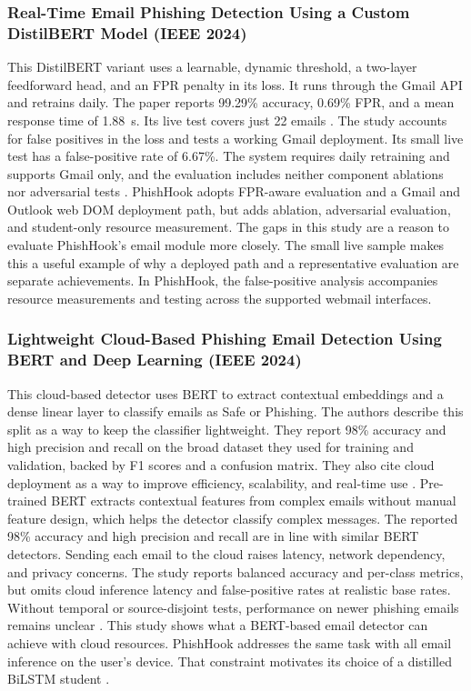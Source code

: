 \documentclass{FastFyp}
\begin{document}
\subsubsection{Real-Time Email Phishing Detection Using a Custom DistilBERT Model (IEEE 2024)}
This DistilBERT variant uses a learnable, dynamic threshold, a two-layer feedforward head, and an FPR penalty in its loss. It runs through the Gmail API and retrains daily. The paper reports 99.29\% accuracy, 0.69\% FPR, and a mean response time of 1.88~s. Its live test covers just 22 emails \cite{distilbertemail2024}. The study accounts for false positives in the loss and tests a working Gmail deployment. Its small live test has a false-positive rate of 6.67\%. The system requires daily retraining and supports Gmail only, and the evaluation includes neither component ablations nor adversarial tests \cite{distilbertemail2024}. PhishHook adopts FPR-aware evaluation and a Gmail and Outlook web DOM deployment path, but adds ablation, adversarial evaluation, and student-only resource measurement. The gaps in this study are a reason to evaluate PhishHook's email module more closely. The small live sample makes this a useful example of why a deployed path and a representative evaluation are separate achievements. In PhishHook, the false-positive analysis accompanies resource measurements and testing across the supported webmail interfaces.

\subsubsection{Lightweight Cloud-Based Phishing Email Detection Using BERT and Deep Learning (IEEE 2024)}
This cloud-based detector uses BERT to extract contextual embeddings and a dense linear layer to classify emails as Safe or Phishing. The authors describe this split as a way to keep the classifier lightweight. They report 98\% accuracy and high precision and recall on the broad dataset they used for training and validation, backed by F1 scores and a confusion matrix. They also cite cloud deployment as a way to improve efficiency, scalability, and real-time use \cite{cloudbert2024}. Pre-trained BERT extracts contextual features from complex emails without manual feature design, which helps the detector classify complex messages. The reported 98\% accuracy and high precision and recall are in line with similar BERT detectors. Sending each email to the cloud raises latency, network dependency, and privacy concerns. The study reports balanced accuracy and per-class metrics, but omits cloud inference latency and false-positive rates at realistic base rates. Without temporal or source-disjoint tests, performance on newer phishing emails remains unclear \cite{cloudbert2024}. This study shows what a BERT-based email detector can achieve with cloud resources. PhishHook addresses the same task with all email inference on the user's device. That constraint motivates its choice of a distilled BiLSTM student \cite{cloudbert2024}.
\end{document}

